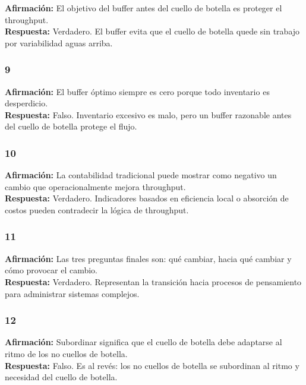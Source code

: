\documentclass[
  11pt,
]{article}
\begin{document}
\textbf{Afirmación:} El objetivo del buffer antes del cuello de botella
es proteger el throughput.\\
\textbf{Respuesta:} Verdadero. El buffer evita que el cuello de botella
quede sin trabajo por variabilidad aguas arriba.

\hypertarget{section-8}{%
\subsubsection{9}\label{section-8}}

\textbf{Afirmación:} El buffer óptimo siempre es cero porque todo
inventario es desperdicio.\\
\textbf{Respuesta:} Falso. Inventario excesivo es malo, pero un buffer
razonable antes del cuello de botella protege el flujo.

\hypertarget{section-9}{%
\subsubsection{10}\label{section-9}}

\textbf{Afirmación:} La contabilidad tradicional puede mostrar como
negativo un cambio que operacionalmente mejora throughput.\\
\textbf{Respuesta:} Verdadero. Indicadores basados en eficiencia local o
absorción de costos pueden contradecir la lógica de throughput.

\hypertarget{section-10}{%
\subsubsection{11}\label{section-10}}

\textbf{Afirmación:} Las tres preguntas finales son: qué cambiar, hacia
qué cambiar y cómo provocar el cambio.\\
\textbf{Respuesta:} Verdadero. Representan la transición hacia procesos
de pensamiento para administrar sistemas complejos.

\hypertarget{section-11}{%
\subsubsection{12}\label{section-11}}

\textbf{Afirmación:} Subordinar significa que el cuello de botella debe
adaptarse al ritmo de los no cuellos de botella.\\
\textbf{Respuesta:} Falso. Es al revés: los no cuellos de botella se
subordinan al ritmo y necesidad del cuello de botella.
\end{document}
